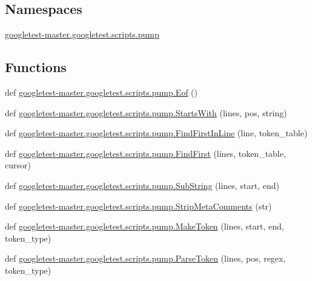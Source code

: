 \subsection*{Namespaces}
\begin{DoxyCompactItemize}
\item 
 \mbox{\hyperlink{namespacegoogletest-master_1_1googletest_1_1scripts_1_1pump}{googletest-\/master.\+googletest.\+scripts.\+pump}}
\end{DoxyCompactItemize}
\subsection*{Functions}
\begin{DoxyCompactItemize}
\item 
def \mbox{\hyperlink{namespacegoogletest-master_1_1googletest_1_1scripts_1_1pump_a6a528a6e3710885d16d33bbbe9ee45b8}{googletest-\/master.\+googletest.\+scripts.\+pump.\+Eof}} ()
\item 
def \mbox{\hyperlink{namespacegoogletest-master_1_1googletest_1_1scripts_1_1pump_a2814ca5ce847fc4e41730d81c0fd6683}{googletest-\/master.\+googletest.\+scripts.\+pump.\+Starts\+With}} (lines, pos, string)
\item 
def \mbox{\hyperlink{namespacegoogletest-master_1_1googletest_1_1scripts_1_1pump_af8f0f5a0e136ebd1947b1d583aadc319}{googletest-\/master.\+googletest.\+scripts.\+pump.\+Find\+First\+In\+Line}} (line, token\+\_\+table)
\item 
def \mbox{\hyperlink{namespacegoogletest-master_1_1googletest_1_1scripts_1_1pump_a2830a0e2b98580528299da5d83efe04e}{googletest-\/master.\+googletest.\+scripts.\+pump.\+Find\+First}} (lines, token\+\_\+table, cursor)
\item 
def \mbox{\hyperlink{namespacegoogletest-master_1_1googletest_1_1scripts_1_1pump_a340fe1bba7ee6be6192dd247c5a47473}{googletest-\/master.\+googletest.\+scripts.\+pump.\+Sub\+String}} (lines, start, end)
\item 
def \mbox{\hyperlink{namespacegoogletest-master_1_1googletest_1_1scripts_1_1pump_a2b0690099ba16ba15b6528cb42022f88}{googletest-\/master.\+googletest.\+scripts.\+pump.\+Strip\+Meta\+Comments}} (str)
\item 
def \mbox{\hyperlink{namespacegoogletest-master_1_1googletest_1_1scripts_1_1pump_a28c5e8ae08f5f6a09248e5540755037b}{googletest-\/master.\+googletest.\+scripts.\+pump.\+Make\+Token}} (lines, start, end, token\+\_\+type)
\item 
def \mbox{\hyperlink{namespacegoogletest-master_1_1googletest_1_1scripts_1_1pump_af5d3c06f48dc1fb836a60acc09fd30c6}{googletest-\/master.\+googletest.\+scripts.\+pump.\+Parse\+Token}} (lines, pos, regex, token\+\_\+type)

\end{DoxyCompactItemize}
